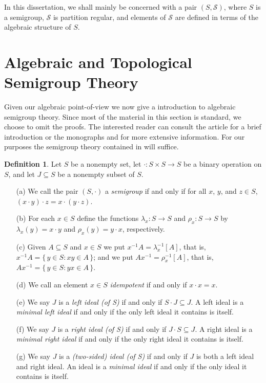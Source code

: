 \documentclass[12pt]{article}
\theoremstyle{plain}
\theoremstyle{definition}
\newtheorem{defn}[thm]{Definition}
\newcommand{\calS}{\mathcal{S}}
\begin{document}
In this dissertation, we shall mainly be concerned with a pair $(S, \calS)$, where $S$ is a semigroup, $\calS$ is partition regular, and elements of $\calS$ are defined in terms of the algebraic structure of $S$.

\section{Algebraic and Topological Semigroup Theory}
Given our algebraic point-of-view we now give a introduction to algebraic semigroup theory.
Since most of the material in this section is standard, we choose to omit the proofs.
The interested reader can consult the article \cite{Hollings:2007uq} for a brief introduction or the monographs \cite{Clifford:1961fk} and \cite{Clifford:1967fk} for more extensive information. 
For our purposes the semigroup theory contained in \cite[Chapters 1 and 2]{Hindman:1998fk} will suffice. 

\begin{defn}
  Let $S$ be a nonempty set, let $\cdot \colon S \times S \to S$ be
  a binary operation on $S$, and let $J \subseteq S$ be a nonempty
  subset of $S$.
  \begin{itemize}
    \item[(a)] We call the pair $(S, \cdot)$ a \textsl{semigroup} if
      and only if for all $x$, $y$, and $z \in S$, $(x \cdot y) \cdot
      z = x \cdot (y \cdot z)$.
    \item[(b)] For each $x \in S$ define the functions $\lambda_x
      \colon S \to S$ and $\rho_x \colon S \to S$ by $\lambda_x(y) = x
      \cdot y$ and $\rho_x(y) = y \cdot x$, respectively.

    \item[(c)] Given $A \subseteq S$ and $x \in S$ we put $x^{-1}A = \lambda_x^{-1}[A]$, that is, $x^{-1}A = \{\, y \in S : xy \in A \,\}$; and we put $Ax^{-1} = \rho_x^{-1}[A]$, that is, $Ax^{-1} = \{\, y \in S : yx \in A \,\}$.

    \item[(d)] We call an element $x \in S$ \textsl{idempotent} if and
      only if $x\cdot x = x$. 
    \item[(e)] We say $J$ is a \textsl{left ideal (of S)} if and only
      if $S \cdot J \subseteq J$.
      A left ideal is a \textsl{minimal left ideal} if and only if the
      only left ideal it contains is itself.
    \item[(f)] We say $J$ is a \textsl{right ideal (of S)} if and only
      if $J \cdot S \subseteq J$.
      A right ideal is a \textsl{minimal right ideal} if and only if the
      only right ideal it contains is itself.
    \item[(g)] We say $J$ is a \textsl{(two-sided) ideal (of S)} if and only
      if $J$ is both a left ideal and right ideal.
      An ideal is a \textsl{minimal ideal} if and only if the only
      ideal it contains is itself.
  \end{itemize}
\end{defn}
\end{document}

